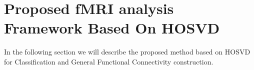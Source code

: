 \documentclass[journal]{IEEEtran}
\begin{document}
	
%	



\section{Proposed fMRI analysis Framework Based On HOSVD}

In the following section we will describe the proposed method based on HOSVD for Classification and General Functional Connectivity construction.
\end{document}
